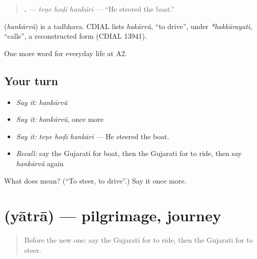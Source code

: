 \begin{quote}
\textbf{  .} — \emph{teṇe hoḍī hankārī} — \textquotedblleft{}He steered the boat.\textquotedblright{}
\end{quote}

\begin{cousinweb}
\textbf{} (\emph{hankārvũ}) is a tadbhava. CDIAL lists \emph{hakārvũ}, \textquotedblleft{}to drive\textquotedblright{}, under \emph{*hakkārayati}, \textquotedblleft{}calls\textquotedblright{}, a reconstructed form (CDIAL 13941).
\end{cousinweb}

\begin{grammarlens}[title={What you've built}]
One more word for everyday life at A2.
\end{grammarlens}

\subsection*{Your turn}
\begin{itemize}
\raggedright
  \item \emph{Say it:} \emph{hankārvũ}
  \item \emph{Say it:} \emph{hankārvũ}, once more
  \item \emph{Say it:} \emph{teṇe hoḍī hankārī} — He steered the boat.
  \item \emph{Recall:} say the Gujarati for boat, then the Gujarati for to ride, then say \emph{hankārvũ} again
\end{itemize}

\begin{tcolorbox}[breakable,colback=teal!4,colframe=teal!35!black,title={Before you move on}]
What does  mean? (\textquotedblleft{}To steer, to drive\textquotedblright{}.) Say it once more.
\end{tcolorbox}
\section[\texorpdfstring{\gu{યાત્રા} (yātrā)}{યાત્રા (yātrā)}]{ (yātrā) — pilgrimage, journey}

\label{lesson:GU-C211-yatra}



\begin{quote}
Before the new one: say the Gujarati for to ride, then the Gujarati for to steer.
\end{quote}

